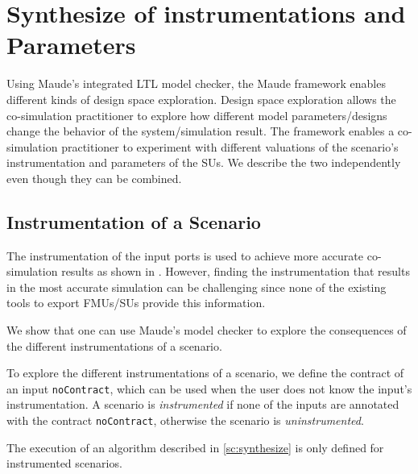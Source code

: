 
\section{Synthesize of instrumentations and Parameters}\label{sc:DSE}
Using Maude's integrated LTL model checker, the Maude framework enables different kinds of design space exploration.
Design space exploration allows the co-simulation practitioner to explore how different model parameters/designs change the behavior of the system/simulation result.
The framework enables a co-simulation practitioner to experiment with different valuations of the scenario's instrumentation and parameters of the SUs.
We describe the two independently even though they can be combined.


\subsection{Instrumentation of a Scenario}
The instrumentation of the input ports is used to achieve more accurate co-simulation results as shown in \cite{Gomes2019,Oakes2021,hansen_verification_2021}.
However, finding the instrumentation that results in the most accurate simulation can be challenging since none of the existing tools to export FMUs/SUs provide this information.

We show that one can use Maude's model checker to explore the consequences of the different instrumentations of a scenario.

To explore the different instrumentations of a scenario, we define the contract of an input \texttt{noContract}, which can be used when the user does not know the input's instrumentation.
A scenario is \emph{instrumented} if none of the inputs are annotated with the contract \texttt{noContract}, otherwise the scenario is \emph{uninstrumented}.

The execution of an algorithm described in \cref{sc:synthesize} is only defined for instrumented scenarios.

